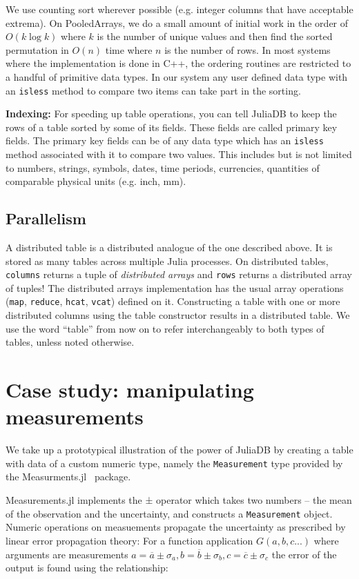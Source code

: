 \documentclass{juliacon}
\begin{document}
We use counting sort wherever possible (e.g. integer columns that have acceptable extrema). On PooledArrays, we do a small amount of initial work in the order of $O(k \log k)$ where $k$ is the number of unique values and then find the sorted permutation in $O(n)$ time where $n$ is the number of rows. In most systems where the implementation is done in C++, the ordering routines are restricted to a handful of primitive data types. In our system any user defined data type with an \texttt{isless} method to compare two items can take part in the sorting.

\textbf{Indexing: }For speeding up table operations, you can tell
JuliaDB to keep the rows of a table sorted by some of its fields.
These fields are called primary key fields. The primary key fields
can be of any data type which has an \texttt{isless} method associated
with it to compare two values. This includes but is not limited to
numbers, strings, symbols, dates, time periods, currencies, quantities
of comparable physical units (e.g. inch, mm).

\subsection{Parallelism}

A distributed table is a distributed analogue of the one described
above. It is stored as many tables across multiple Julia processes. On distributed tables,
\texttt{columns} returns a tuple of \emph{distributed arrays} and
\texttt{rows} returns a distributed array of tuples! The distributed
arrays implementation has the usual array operations (\texttt{map}, \texttt{reduce}, \texttt{hcat}, \texttt{vcat}) defined on it. Constructing a
table with one or more distributed columns using the table constructor
results in a distributed table. We use the word ``table'' from now on to refer interchangeably to both types of tables, unless
noted otherwise.

\section{Case study: manipulating measurements}
\label{sec:measurements}

We take up a prototypical illustration of the power of JuliaDB by creating a table with data of a custom numeric type, namely the \texttt{Measurement} type provided by the Measurments.jl~\cite{giordano2016} package.

Measurements.jl implements the ± operator which takes two numbers -- the mean of the observation and the uncertainty, and constructs a \texttt{Measurement} object. Numeric operations on measuements propagate the uncertainty as prescribed by linear error propagation theory: For a function application $G(a,b,c...)$ where arguments are measurements $a=\overline{a} \pm \sigma_{a}, b=\overline{b} \pm \sigma_{b}, c=\overline{c} \pm \sigma_{c}$ the error of the output is found using the relationship: 
\end{document}
